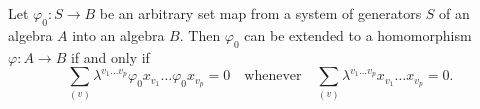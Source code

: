 Let $\varphi_0: S \to B$ be an arbitrary set map from a system of generators $S$ of an algebra $A$ into an algebra $B$. Then $\varphi_0$ can be extended to a homomorphism $\varphi: A \to B$ if and only if
$$
\sum_{(v)} \lambda^{v_1 \dots v_p} \varphi_0 x_{v_1} \dots \varphi_0 x_{v_p} = 0 \quad \text{whenever} \quad \sum_{(v)} \lambda^{v_1 \dots v_p} x_{v_1} \dots x_{v_p} = 0.
$$
